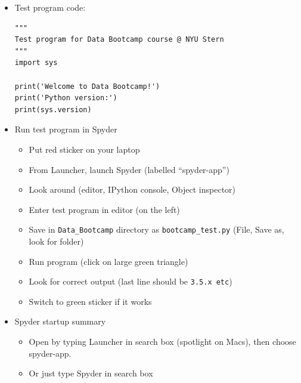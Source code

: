 \begin{itemize}
\item Test program code:

\vspace{-0.1in}
\begin{verbatim}
"""
Test program for Data Bootcamp course @ NYU Stern
"""
import sys

print('Welcome to Data Bootcamp!')
print('Python version:')
print(sys.version)
\end{verbatim}

\item Run test program in Spyder
\begin{itemize}
\item Put red sticker on your laptop
\item From Launcher, launch Spyder (labelled ``spyder-app'')
\item Look around (editor, IPython console, Object inspector)
\item Enter test program in editor (on the left)
\item Save in \verb|Data_Bootcamp| directory as \verb|bootcamp_test.py|
(File, Save as, look for folder)
\item Run program (click on large green triangle)
\item Look for correct output (last line should be {\tt 3.5.x etc})
\item Switch to green sticker if it works
\end{itemize}


\item Spyder startup summary
\begin{itemize}
\item Open by typing Launcher in search box (spotlight on Macs), then choose spyder-app.
\item Or just type Spyder in search box
\end{itemize}
\end{itemize}

